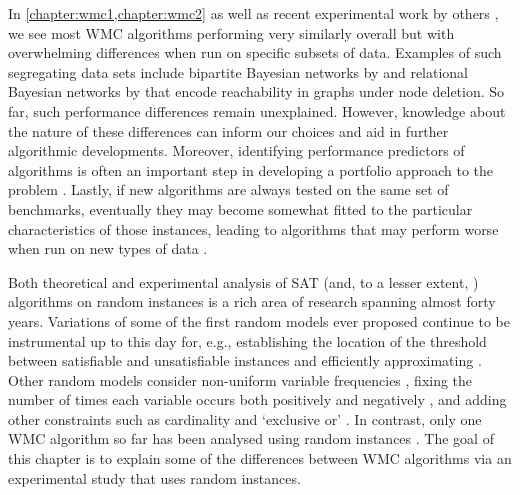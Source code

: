 In \cref{chapter:wmc1,chapter:wmc2} as well as recent experimental work by
others
\citep{DBLP:conf/aaai/DudekPV20,DBLP:conf/cp/DudekPV20,DBLP:conf/ijcai/LagniezM17},
we see most WMC algorithms performing very similarly overall but with
overwhelming differences when run on specific subsets of data. Examples of such
segregating data sets include bipartite Bayesian networks by
\citet{DBLP:conf/aaai/SangBK05} and relational Bayesian networks by
\citet{DBLP:journals/ijar/ChaviraDJ06} that encode reachability in graphs under
node deletion. So far, such performance differences remain unexplained. However,
knowledge about the nature of these differences can inform our choices and aid
in further algorithmic developments. Moreover, identifying performance
predictors of algorithms is often an important step in developing a portfolio
approach to the problem \citep{DBLP:journals/jair/XuHHL08}. Lastly, if new
algorithms are always tested on the same set of benchmarks, eventually they may
become somewhat fitted to the particular characteristics of those instances,
leading to algorithms that may perform worse when run on new types of data
\citep{DBLP:conf/cec/HossainALA10}.


Both theoretical and experimental analysis of SAT (and, to a lesser extent,
\mc{}) algorithms on random instances is a rich area of research spanning almost
forty years. Variations of some of the first random models ever proposed
\citep{DBLP:journals/dam/FrancoP83,DBLP:journals/siamcomp/PurdomB83} continue to
be instrumental up to this day for, e.g., establishing the location of the
threshold between satisfiable and unsatisfiable instances
\citep{DBLP:conf/focs/AchlioptasM02} and efficiently approximating \mc{}
\citep{DBLP:conf/icalp/GalanisG0Y20}. Other random models consider non-uniform
variable frequencies \citep{DBLP:conf/ijcai/AnsoteguiBL09}, fixing the number of
times each variable occurs both positively and negatively
\citep{DBLP:journals/cpc/Coja-OghlanW18}, and adding other constraints such as
cardinality and `exclusive or' \citep{DBLP:conf/ijcai/PoteJM19}. In contrast,
only one WMC algorithm so far has been analysed using random instances
\citep{DBLP:conf/sat/SangBBKP04,DBLP:conf/sat/SangBK05}. The goal of this
chapter is to explain some of the differences between WMC algorithms via an
experimental study that uses random instances.


